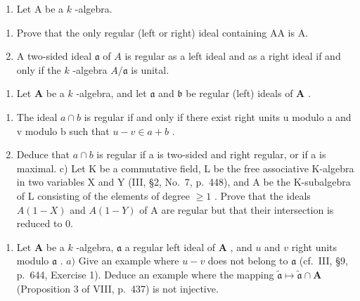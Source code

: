 
\begin{enumerate}
\def\labelenumi{\arabic{enumi})}
\tightlist
\item
  Let \(\mathrm{A}\) be a \(k\) -algebra.
\end{enumerate}

\begin{enumerate}
\def\labelenumi{\alph{enumi})}
\item
  Prove that the only regular (left or right) ideal containing AA is A.
\item
  A two-sided ideal \(\mathfrak{a}\) of \(A\) is regular as a left ideal and as a right ideal if and only if the \(k\) -algebra \(A / \mathfrak{a}\) is unital.
\end{enumerate}

\begin{enumerate}
\def\labelenumi{\arabic{enumi})}
\setcounter{enumi}{1}
\tightlist
\item
  Let \(\mathbf{A}\) be a \(k\) -algebra, and let \(\mathfrak{a}\) and \(\mathfrak{b}\) be regular (left) ideals of \(\mathbf{A}\) .
\end{enumerate}

\begin{enumerate}
\def\labelenumi{\alph{enumi})}
\item
  The ideal \(a \cap b\) is regular if and only if there exist right units u modulo a and v modulo b such that \(u - v \in a + b\) .
\item
  Deduce that \(a \cap b\) is regular if a is two-sided and right regular, or if a is maximal. c) Let K be a commutative field, L be the free associative K-algebra in two variables X and Y (III, §2, No.~7, p.~448), and A be the K-subalgebra of L consisting of the elements of degree \(\geqslant 1\) . Prove that the ideals \(A(1 - X)\) and \(A(1 - Y)\) of A are regular but that their intersection is reduced to 0.
\end{enumerate}

\begin{enumerate}
\def\labelenumi{\arabic{enumi})}
\setcounter{enumi}{2}
\tightlist
\item
  Let \(\mathbf{A}\) be a \(k\) -algebra, \(\mathfrak{a}\) a regular left ideal of \(\mathbf{A}\) , and \(u\) and \(v\) right units modulo \(\mathfrak{a}\) . \(a)\) Give an example where \(u - v\) does not belong to \(\mathfrak{a}\) (cf.~III, §9, p.~644, Exercise 1). Deduce an example where the mapping \(\widetilde{\mathfrak{a}} \mapsto \widetilde{\mathfrak{a}} \cap \mathbf{A}\) (Proposition 3 of VIII, p.~437) is not injective.
\end{enumerate}

